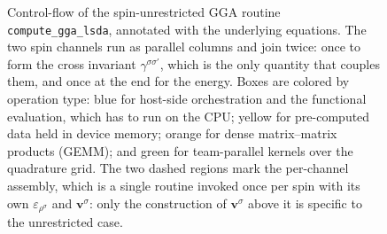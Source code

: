 \documentclass{article}
\begin{document}
\begin{figure}[H]
{}

  \caption{Control-flow of the spin-unrestricted GGA routine
    \texttt{compute\_gga\_lsda}, annotated with the underlying
    equations. The two spin channels run as parallel columns and join
    twice: once to form the cross invariant
    $\gamma^{\sigma\sigma'}$, which is the only quantity that couples
    them, and once at the end for the energy. Boxes are colored by
    operation type: blue for host-side orchestration and the functional
    evaluation, which has to run on the CPU; yellow for pre-computed
    data held in device memory; orange for dense matrix--matrix
    products (GEMM); and green for team-parallel kernels over the
    quadrature grid. The two dashed regions mark the per-channel
    assembly, which is a single routine invoked once per spin with its
    own $\varepsilon_{\rho^\sigma}$ and $\mathbf v^\sigma$: only the
    construction of $\mathbf v^\sigma$ above it is specific to the
  unrestricted case.}
  \label{fig:gga_lsda_flow}
\end{figure}
\end{document}
